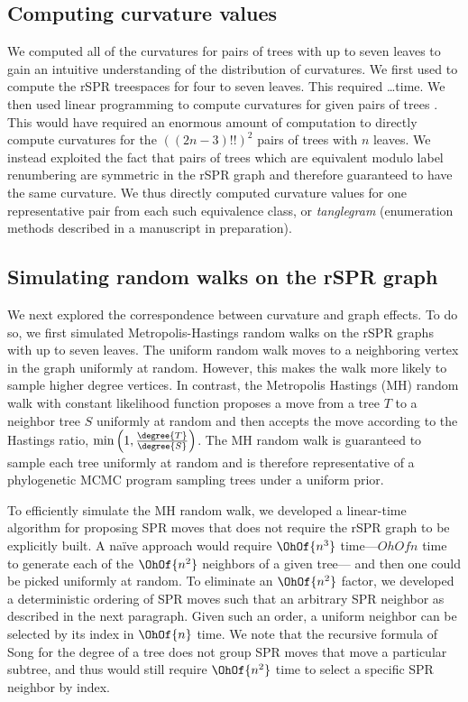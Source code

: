 \documentclass{amsart}
\begin{document}
\subsection{Computing curvature values}
We computed all of the curvatures for pairs of trees with up to seven leaves to gain an intuitive understanding of the distribution of curvatures.
We first used \todo{\dots} to compute the rSPR treespaces for four to seven leaves.
This required \dots time.
We then used linear programming to compute curvatures for given pairs of trees \cite{gricci}.
This would have required an enormous amount of computation to directly compute curvatures for the $((2n-3)!!)^2$ pairs of trees with $n$ leaves.
We instead exploited the fact that pairs of trees which are equivalent modulo label renumbering are symmetric in the rSPR graph and therefore guaranteed to have the same curvature.
We thus directly computed curvature values for one representative pair from each such equivalence class, or \emph{tanglegram} (enumeration methods described in a manuscript in preparation).



\subsection{Simulating random walks on the rSPR graph}
\label{sec:random_walks}
We next explored the correspondence between curvature and graph effects.
To do so, we first simulated Metropolis-Hastings random walks on the rSPR graphs with up to seven leaves.
The uniform random walk moves to a neighboring vertex in the graph uniformly at random.
However, this makes the walk more likely to sample higher degree vertices.
In contrast, the Metropolis Hastings (MH) random walk with constant likelihood function proposes a move from a tree $T$ to a neighbor tree $S$ uniformly at random and then accepts the move according to the Hastings ratio, $\min\left(1, \frac{\degree{T}}{\degree{S}}\right)$.
The MH random walk is guaranteed to sample each tree uniformly at random and is therefore representative of a phylogenetic MCMC program sampling trees under a uniform prior.

To efficiently simulate the MH random walk, we developed a linear-time algorithm for proposing SPR moves that does not require the rSPR graph to be explicitly built.
A na\"ive approach would require $\OhOf{n^3}$ time---$OhOf{n}$ time to generate each of the $\OhOf{n^2}$ neighbors of a given tree--- and then one could be picked uniformly at random.
To eliminate an $\OhOf{n^2}$ factor, we developed a deterministic ordering of SPR moves such that an arbitrary SPR neighbor as described in the next paragraph.
Given such an order, a uniform neighbor can be selected by its index in $\OhOf{n}$ time.
We note that the recursive formula of Song \cite{Song2003-gf} for the degree of a tree does not group SPR moves that move a particular subtree, and thus would still require $\OhOf{n^2}$ time to select a specific SPR neighbor by index.
\end{document}
